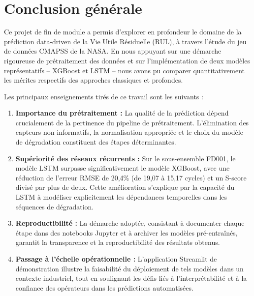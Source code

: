\documentclass[12pt,a4paper]{report}
\theoremstyle{definition}
\begin{document}
\chapter*{Conclusion générale}

Ce projet de fin de module a permis d'explorer en profondeur le domaine de la prédiction data-driven de la Vie Utile Résiduelle (RUL), à travers l'étude du jeu de données CMAPSS de la NASA. En nous appuyant sur une démarche rigoureuse de prétraitement des données et sur l'implémentation de deux modèles représentatifs -- XGBoost et LSTM -- nous avons pu comparer quantitativement les mérites respectifs des approches classiques et profondes.

Les principaux enseignements tirés de ce travail sont les suivants :

\begin{enumerate}
    \item \textbf{Importance du prétraitement :} La qualité de la prédiction dépend crucialement de la pertinence du pipeline de prétraitement. L'élimination des capteurs non informatifs, la normalisation appropriée et le choix du modèle de dégradation constituent des étapes déterminantes.
    
    \item \textbf{Supériorité des réseaux récurrents :} Sur le sous-ensemble FD001, le modèle LSTM surpasse significativement le modèle XGBoost, avec une réduction de l'erreur RMSE de 20,4\% (de 19,07 à 15,17 cycles) et un S-score divisé par plus de deux. Cette amélioration s'explique par la capacité du LSTM à modéliser explicitement les dépendances temporelles dans les séquences de dégradation.
    
    \item \textbf{Reproductibilité :} La démarche adoptée, consistant à documenter chaque étape dans des notebooks Jupyter et à archiver les modèles pré-entraînés, garantit la transparence et la reproductibilité des résultats obtenus.
    
    \item \textbf{Passage à l'échelle opérationnelle :} L'application Streamlit de démonstration illustre la faisabilité du déploiement de tels modèles dans un contexte industriel, tout en soulignant les défis liés à l'interprétabilité et à la confiance des opérateurs dans les prédictions automatisées.
\end{enumerate}
\end{document}
